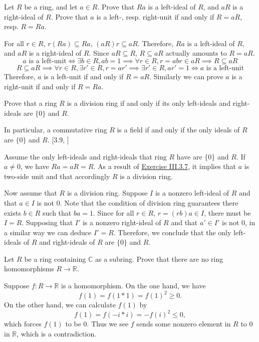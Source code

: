 \documentclass[12pt,letterpaper,boxed]{hmcpset}
\newcommand{\R}{\mathbb{R}}
\newcommand{\C}{\mathbb{C}}
\begin{document}
\hypertarget{Exercise III.3.7}{}
\begin{problem}[3.7]
Let $R$ be a ring, and let $a\in R$. Prove that $Ra$ is a left-ideal of $R$, and $aR$ is a right-ideal of $R$. Prove that $a$ is a left-, resp. right-unit if and only if $R = aR$, resp. $R = Ra$.
\end{problem}
\begin{solution}
For all $r\in R$, $r(Ra)\subseteq Ra$, $(aR)r\subseteq aR$. Therefore, $Ra$ is a left-ideal of $R$, and $aR$ is a right-ideal of $R$. Since $aR\subseteq R$, $R\subseteq aR$ actually amounts to $R = aR$. 
\[
a\text{ is a left-unit}\iff\exists b\in R, ab=1\implies \forall r\in R,r=abr\in aR\implies R\subseteq aR
\]
\[
R\subseteq aR\implies\forall r\in R,\exists r'\in R,r=ar'\implies \exists r'\in R, ar'=1\iff a\text{ is a left-unit}
\]
Therefore, $a$ is a left-unit if and only if $R = aR$. Similarly we can prove $a$ is a right-unit if and only if $R = Ra$.
\end{solution}

\begin{problem}[3.8]
Prove that a ring $R$ is a division ring if and only if its only left-ideals and right-ideals are $\{0\}$ and $R$.

In particular, a commutative ring $R$ is a field if and only if the only ideals of $R$ are $\{0\}$ and $R$. [3.9, ]
\end{problem}
\begin{solution}
Assume the only left-ideals and right-ideals that ring $R$ have are $\{0\}$ and $R$. If $a\ne0$, we have $Ra=aR=R$. As a result of \hyperlink{Exercise III.3.7}{Exercise III.3.7}, it implies that $a$ is two-side unit and that accordingly $R$ is a division ring.

Now assume that $R$ is a division ring. Suppose $I$ is a nonzero left-ideal of $R$ and that $a\in I$ is not 0. Note that the condition of division ring guarantees there exists $b\in R$ such that $ba=1$. Since for all $r\in R$, $r=(rb)a\in I$, there must be $I=R$. Supposing that $I'$ is a nonzero right-ideal of $R$ and that $a'\in I'$ is not 0, in a similar way we can deduce $I'=R$. Therefore, we conclude that the only left-ideals of $R$ and right-ideals of $R$ are $\{0\}$ and $R$.
\end{solution}

\begin{problem}[3.11]
Let $R$ be a ring containing $\C$ as a subring. Prove that there are no ring homomorphisms $R \to \R$.
\end{problem}
\begin{solution}
	Suppose $f:R \to \R$ is a homomorphism. On the one hand, we have
	\[
	f(1)=f(1*1)=f(1)^2\ge0.
	\]
	On the other hand, we can calculate $f(1)$ by
	\[
	f(1)=f(-i*i)=-f(i)^2\le0,
	\]
	which forces $f(1)$ to be 0. Thus we see $f$ sends some nonzero element in $R$ to 0 in $\R$, which is a contradiction.
\end{solution}
\end{document}
